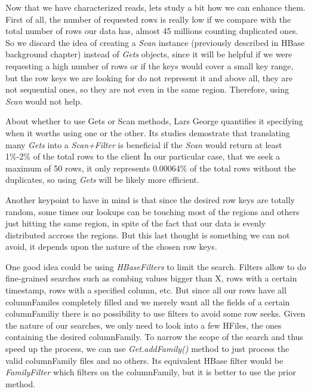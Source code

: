 Now that we have characterized reads, lets study a bit how we can enhance them. 
\\
First of all, the number of requested rows is really low if we compare with the total number of rows our data has, almost 45 millions counting duplicated ones. So we discard the idea of creating a \textit{Scan} instance (previously described in HBase background chapter) instead of \textit{Gets} objects, since it will be helpful if we were requesting a high number of rows or if the keys would cover a small key range, but the row keys we are looking for do not represent it and above all, they are not sequential ones, so they are not even in the same region. Therefore, using \textit{Scan} would not help. 
\par
About whether to use Gets or Scan methods, Lars George quantifies it specifying when it worths using one or the other. Its studies demostrate that translating many \textit{Gets} into a \textit{Scan+Filter} is beneficial if the \textit{Scan} would return at least 1\%-2\% of the total rows to the client \cite{http://permalink.gmane.org/gmane.comp.java.hadoop.hbase.user/33133}\. In our particular case, that we seek a maximum of 50 rows, it only represents 0.00064\% of the total rows without the duplicates, so using \textit{Gets} will be likely more efficient.
\par
Another keypoint to have in mind is that since the desired row keys are totally random, some times our lookups can be touching most of the regions and others just hitting the same region, in spite of the fact that our data is evenly distributed accross the regions. But this last thought is something we can not avoid, it depends upon the nature of the chosen row keys.
\par
One good idea could be using \textit{HBaseFilters} to limit the search. Filters allow to do fine-grained searches such as combing values bigger than X, rows with a certain timestamp, rows with a specified column, etc. But since all our rows have all columnFamiles completely filled and we merely want all the fields of a certain columnFamiliy there is no possibility to use filters to avoid some row seeks. Given the nature of our searches, we only need to look into a few HFiles, the ones containing the desired columnFamily. To narrow the scope of the search and thus speed up the process, we can use \textit{Get.addFamily()} method to just process the valid columnFamily files and no others. Its equivalent HBase filter would be \textit{FamilyFilter} which filters on the columnFamily, but it is better to use the prior method.
\par

